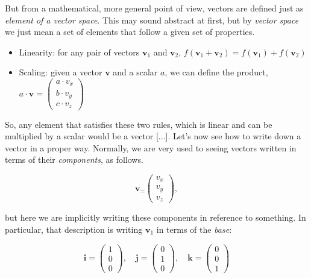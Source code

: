 \documentclass{book}
\begin{document}
But from a mathematical, more general point of view, vectors are defined just as \textit{element of a vector space}. This may sound abstract at first, but by \textit{vector space} we just mean a set of elements that follow a given set of properties.

\begin{itemize}
\item Linearity: for any pair of vectors $\mathbf{v}_1$ and  $\mathbf{v}_2$, $f(\mathbf{v}_1 + \mathbf{v}_2) =  f(\mathbf{v}_1) + f(\mathbf{v}_2)$
\item Scaling: given a vector $\mathbf{v}$ and a scalar $a$, we can define the product, $a \cdot \mathbf{v} = \begin{pmatrix} a \cdot v_{x} \\ b \cdot v_{y} \\ c \cdot v_{z} \end{pmatrix}$
\end{itemize}

So, any element that satisfies these two rules, which is linear and can be multiplied by a scalar would be a vector [...]. Let's now see how to write down a vector in a proper way. Normally, we are very used to seeing vectors written in terms of their \textit{components}, as follows.

\begin{equation}
	\mathbf{v}_ = \begin{pmatrix} v_{x} \\ v_{y} \\ v_{z} \end{pmatrix},
\end{equation}

but here we are implicitly writing these components in reference to something. In particular, that description is writing $\mathbf{v}_1$ in terms of the \textit{base}:

\begin{equation}
	\mathbf{i} = \begin{pmatrix} 1 \\ 0 \\ 0 \end{pmatrix}, \quad
	\mathbf{j} = \begin{pmatrix} 0 \\ 1 \\ 0 \end{pmatrix}, \quad
	\mathbf{k} = \begin{pmatrix} 0 \\ 0 \\ 1 \end{pmatrix} 
\end{equation}
\end{document}

